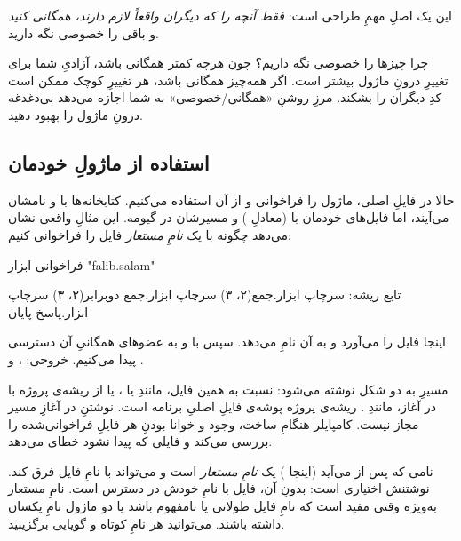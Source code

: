 این یک اصلِ مهمِ طراحی است: \emph{فقط آنچه را
که دیگران واقعاً لازم دارند، همگانی کنید} و باقی را خصوصی نگه دارید.

\begin{tip}
چرا چیزها را خصوصی نگه داریم؟ چون هرچه کمتر همگانی باشد، آزادیِ شما برای تغییرِ
درونِ ماژول بیشتر است. اگر همه‌چیز همگانی باشد، هر تغییرِ کوچک ممکن است کدِ
دیگران را بشکند. مرزِ روشنِ «همگانی/خصوصی» به شما اجازه می‌دهد بی‌دغدغه درونِ
ماژول را بهبود دهید.
\end{tip}

\subsection{استفاده از ماژولِ خودمان}

حالا در فایلِ اصلی، ماژول را فراخوانی و از آن استفاده می‌کنیم. کتابخانه‌ها با
 و نامشان می‌آیند، اما فایل‌های خودمان با  (معادلِ
) و مسیرشان در گیومه. این مثالِ واقعی نشان می‌دهد چگونه با یک
\emph{نامِ مستعار} فایل را فراخوانی کنیم:

\begin{salamfa}
فراخوانی ابزار "falib.salam"

تابع ریشه:
    سرچاپ ابزار.جمع(۲، ۳)
    سرچاپ ابزار.جمع دوبرابر(۲، ۳)
    سرچاپ ابزار.پاسخ
پایان
\end{salamfa}

اینجا  فایل را می‌آورد و به آن نامِ
 می‌دهد. سپس با  و  به
عضوهای همگانیِ آن دسترسی پیدا می‌کنیم. خروجی: ،  و .

\begin{note}
مسیرِ  به دو شکل نوشته می‌شود: نسبت به همین فایل، مانندِ
 یا ، یا از ریشه‌ی پروژه با
 در آغاز، مانندِ . ریشه‌ی پروژه پوشه‌ی
فایلِ اصلیِ برنامه است. نوشتنِ  در آغازِ مسیر مجاز نیست. کامپایلر هنگامِ
ساخت، وجود و خوانا بودنِ هر فایلِ فراخوانی‌شده را بررسی می‌کند و فایلی که پیدا
نشود خطای  می‌دهد.
\end{note}

\begin{note}
نامی که پس از  می‌آید (اینجا ) یک \emph{نامِ
مستعار} است و می‌تواند با نامِ فایل فرق کند. نوشتنش اختیاری است: بدونِ آن، فایل
با نامِ خودش در دسترس است. نامِ مستعار به‌ویژه وقتی مفید است که نامِ فایل طولانی
یا نامفهوم باشد یا دو ماژول نامِ یکسان داشته باشند. می‌توانید هر نامِ کوتاه و
گویایی برگزینید.
\end{note}

